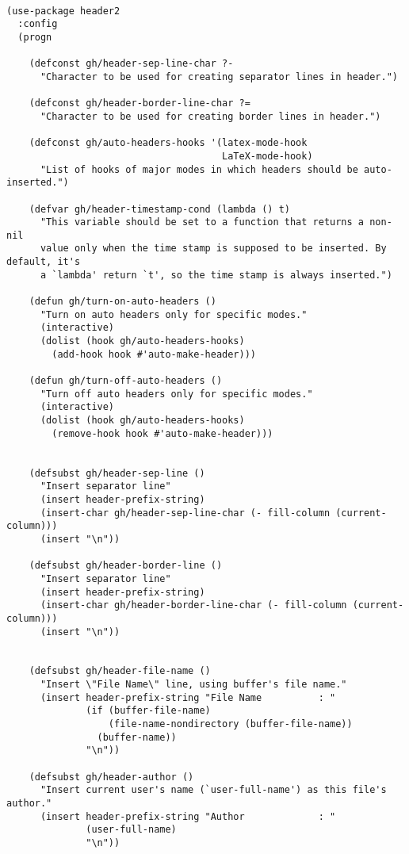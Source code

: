 \documentclass[11pt]{article}
\begin{document}
\begin{verbatim}

(use-package header2
  :config
  (progn

    (defconst gh/header-sep-line-char ?-
      "Character to be used for creating separator lines in header.")

    (defconst gh/header-border-line-char ?=
      "Character to be used for creating border lines in header.")

    (defconst gh/auto-headers-hooks '(latex-mode-hook
                                      LaTeX-mode-hook)
      "List of hooks of major modes in which headers should be auto-inserted.")

    (defvar gh/header-timestamp-cond (lambda () t)
      "This variable should be set to a function that returns a non-nil
      value only when the time stamp is supposed to be inserted. By default, it's
      a `lambda' return `t', so the time stamp is always inserted.")

    (defun gh/turn-on-auto-headers ()
      "Turn on auto headers only for specific modes."
      (interactive)
      (dolist (hook gh/auto-headers-hooks)
        (add-hook hook #'auto-make-header)))

    (defun gh/turn-off-auto-headers ()
      "Turn off auto headers only for specific modes."
      (interactive)
      (dolist (hook gh/auto-headers-hooks)
        (remove-hook hook #'auto-make-header)))


    (defsubst gh/header-sep-line ()
      "Insert separator line"
      (insert header-prefix-string)
      (insert-char gh/header-sep-line-char (- fill-column (current-column)))
      (insert "\n"))

    (defsubst gh/header-border-line ()
      "Insert separator line"
      (insert header-prefix-string)
      (insert-char gh/header-border-line-char (- fill-column (current-column)))
      (insert "\n"))


    (defsubst gh/header-file-name ()
      "Insert \"File Name\" line, using buffer's file name."
      (insert header-prefix-string "File Name          : "
              (if (buffer-file-name)
                  (file-name-nondirectory (buffer-file-name))
                (buffer-name))
              "\n"))

    (defsubst gh/header-author ()
      "Insert current user's name (`user-full-name') as this file's author."
      (insert header-prefix-string "Author             : "
              (user-full-name)
              "\n"))


\end{verbatim}
\end{document}
